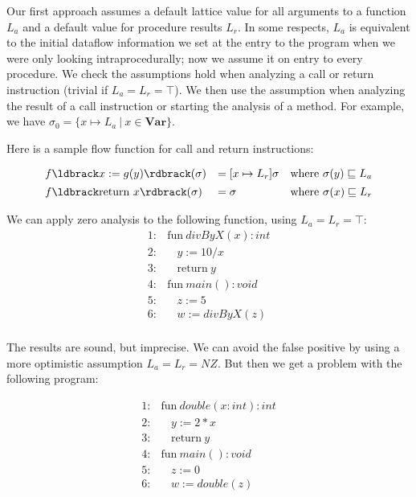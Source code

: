 \documentclass[11pt]{article}
\newcommand{\parg}[1] %
  {\ldbrack #1 \rdbrack}
\newcommand{\alap}{\sqsubseteq}
\begin{document}
Our first approach assumes a default lattice value for all arguments to a function $L_{a}$ and a default value for procedure results $L_{r}$.  In some respects, $L_{a}$ is equivalent to the initial dataflow information we set at the entry to the program when we were only looking intraprocedurally; now we assume it on entry to every procedure.  We check the assumptions hold when analyzing a call or return instruction (trivial if $L_{a} = L_{r} = \top$). We then use the assumption when analyzing the result of a call instruction or starting the analysis of a method.  For example, we have $\sigma_0 = \{ x \mapsto L_{a} ~|~ x \in \mathbf{Var}\}$.

Here is a sample flow function for call and return instructions:

\[
\begin{array}{lll}

f\parg{x := g(y)}(\sigma) & = [x \mapsto L_r]\sigma & \mbox{where}~ \sigma(y) \alap L_a \\[1ex]
f\parg{\mbox{return}~ x}(\sigma) & = \sigma & \mbox{where}~ \sigma(x) \alap L_r \\

\end{array}
\]

We can apply zero analysis to the following function, using $L_a = L_r = \top$: 
\\

\[
\begin{array}{ll}
1: & \mbox{fun}~ \textit{divByX}(x):int\\
2: & ~~~~y := 10 / x\\
3: & ~~~~\mbox{return}~ y\\[1ex]

4: & \mbox{fun}~ \textit{main}() : void\\
5: & ~~~~z := 5\\
6: & ~~~~w := \textit{divByX}(z)\\[1ex]
\end{array}
\]

The results are sound, but imprecise.  We can avoid the false positive by using a more optimistic assumption $L_a = L_r = NZ$.  But then we get a problem with the following program:

\[
\begin{array}{ll}
1: & \mbox{fun}~ \textit{double}(x:int):int\\
2: & ~~~~y := 2 * x\\
3: & ~~~~\mbox{return}~ y\\[1ex]

4: & \mbox{fun}~ \textit{main}() : void\\
5: & ~~~~z := 0\\
6: & ~~~~w := \textit{double}(z)\\[1ex]
\end{array}
\]
\end{document}
